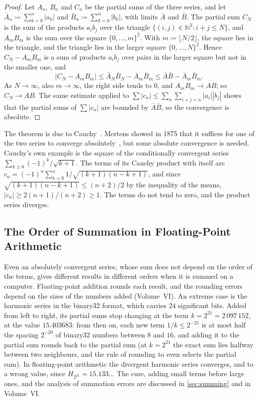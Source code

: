 \begin{proof}
Let $A_n$, $B_n$ and $C_n$ be the partial sums of the three series, and let $\bar A_n\coloneqq\sum_{k=0}^n|a_k|$ and $\bar B_n\coloneqq\sum_{k=0}^n|b_k|$, with limits $\bar A$ and $\bar B$. The partial sum $C_N$ is the sum of the products $a_ib_j$ over the triangle $\{(i,j)\in\mathbb N^2: i+j\le N\}$, and $A_mB_m$ is the sum over the square $\{0,\ldots,m\}^2$. With $m\coloneqq\lfloor N/2\rfloor$, the square lies in the triangle, and the triangle lies in the larger square $\{0,\ldots,N\}^2$. Hence $C_N-A_mB_m$ is a sum of products $a_ib_j$ over pairs in the larger square but not in the smaller one, and
\[
|C_N-A_mB_m|\le\bar A_N\bar B_N-\bar A_m\bar B_m\le\bar A\bar B-\bar A_m\bar B_m .
\]
As $N\to\infty$, also $m\to\infty$, the right side tends to $0$, and $A_mB_m\to AB$; so $C_N\to AB$. The same estimate applied to $\sum|c_n|\le\sum_n\sum_{i+j=n}|a_i||b_j|$ shows that the partial sums of $\sum|c_n|$ are bounded by $\bar A\bar B$, so the convergence is absolute.
\end{proof}

The theorem is due to Cauchy~\cite{cauchy1821}. Mertens showed in 1875 that it suffices for one of the two series to converge absolutely~\cite{mertens1875}, but some absolute convergence is needed. Cauchy's own example is the square of the conditionally convergent series $\sum_{k\ge0}(-1)^k/\sqrt{k+1}$. The terms of its Cauchy product with itself are $c_n=(-1)^n\sum_{k=0}^n1/\sqrt{(k+1)(n-k+1)}$, and since $\sqrt{(k+1)(n-k+1)}\le(n+2)/2$ by the inequality of the means, $|c_n|\ge2(n+1)/(n+2)\ge1$. The terms do not tend to zero, and the product series diverges.

\subsection{The Order of Summation in Floating-Point Arithmetic}

Even an absolutely convergent series, whose sum does not depend on the order of the terms, gives different results in different orders when it is summed on a computer. Floating-point addition rounds each result, and the rounding errors depend on the sizes of the numbers added (Volume~VI). An extreme case is the harmonic series in the binary32 format, which carries $24$ significant bits. Added from left to right, its partial sums stop changing at the term $k=2^{21}=2\,097\,152$, at the value $15.403683$: from then on, each new term $1/k\le2^{-21}$ is at most half the spacing $2^{-20}$ of binary32 numbers between $8$ and $16$, and adding it to the partial sum rounds back to the partial sum (at $k=2^{21}$ the exact sum lies halfway between two neighbours, and the rule of rounding to even selects the partial sum). In floating-point arithmetic the divergent harmonic series converges, and to a wrong value, since $H_{2^{21}}=15.133\ldots$ The cure, adding small terms before large ones, and the analysis of summation errors are discussed in \cref{sec:summing} and in Volume~VI.

